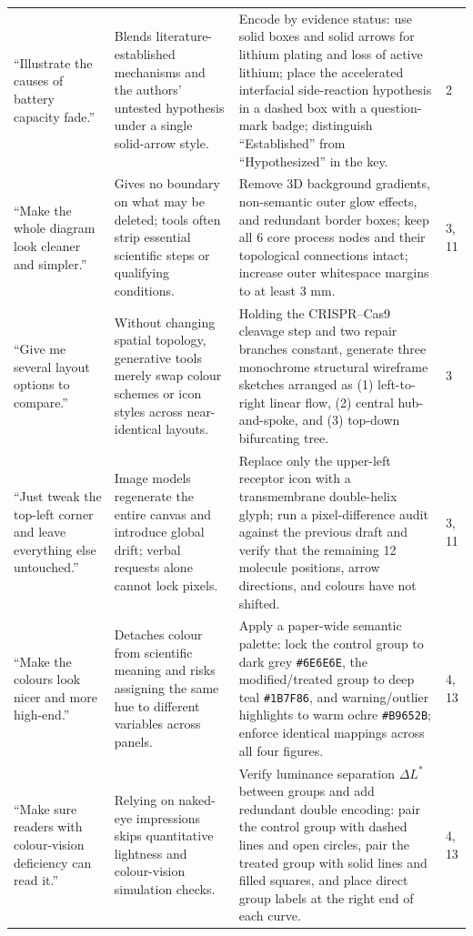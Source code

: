 \begin{longtable}{@{}p{26mm}p{28mm}p{56mm}p{10mm}@{}}
``Illustrate the causes of battery capacity fade.'' & Blends literature-established mechanisms and the authors' untested hypothesis under a single solid-arrow style. & Encode by evidence status: use solid boxes and solid arrows for lithium plating and loss of active lithium; place the accelerated interfacial side-reaction hypothesis in a dashed box with a question-mark badge; distinguish ``Established'' from ``Hypothesized'' in the key. & 2 \\
``Make the whole diagram look cleaner and simpler.'' & Gives no boundary on what may be deleted; tools often strip essential scientific steps or qualifying conditions. & Remove 3D background gradients, non-semantic outer glow effects, and redundant border boxes; keep all 6 core process nodes and their topological connections intact; increase outer whitespace margins to at least 3 mm. & 3, 11 \\
``Give me several layout options to compare.'' & Without changing spatial topology, generative tools merely swap colour schemes or icon styles across near-identical layouts. & Holding the CRISPR--Cas9 cleavage step and two repair branches constant, generate three monochrome structural wireframe sketches arranged as (1) left-to-right linear flow, (2) central hub-and-spoke, and (3) top-down bifurcating tree. & 3 \\
``Just tweak the top-left corner and leave everything else untouched.'' & Image models regenerate the entire canvas and introduce global drift; verbal requests alone cannot lock pixels. & Replace only the upper-left receptor icon with a transmembrane double-helix glyph; run a pixel-difference audit against the previous draft and verify that the remaining 12 molecule positions, arrow directions, and colours have not shifted. & 3, 11 \\
``Make the colours look nicer and more high-end.'' & Detaches colour from scientific meaning and risks assigning the same hue to different variables across panels. & Apply a paper-wide semantic palette: lock the control group to dark grey \texttt{\#6E6E6E}, the modified/treated group to deep teal \texttt{\#1B7F86}, and warning/outlier highlights to warm ochre \texttt{\#B9652B}; enforce identical mappings across all four figures. & 4, 13 \\
``Make sure readers with colour-vision deficiency can read it.'' & Relying on naked-eye impressions skips quantitative lightness and colour-vision simulation checks. & Verify luminance separation $\Delta L^*$ between groups and add redundant double encoding: pair the control group with dashed lines and open circles, pair the treated group with solid lines and filled squares, and place direct group labels at the right end of each curve. & 4, 13 \\

\end{longtable}
